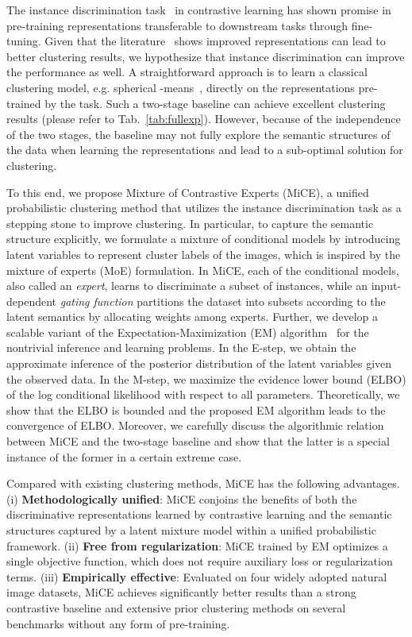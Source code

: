\documentclass{article} \usepackage{iclr2021_conference,times}
\begin{document}
The instance discrimination task~\citep{wu2018unsupervised,he2019momentum} in contrastive learning has shown promise in pre-training representations transferable to downstream tasks through fine-tuning. Given that the literature~\citep{shiran2019multi,niu2020gatcluster} shows improved representations can lead to better clustering results, we hypothesize that instance discrimination can improve the performance as well. A straightforward approach is to learn a classical clustering model, e.g. spherical -means~\citep{dhillon2001concept}, directly on the representations pre-trained by the task. Such a two-stage baseline can achieve excellent clustering results (please refer to Tab.~\ref{tab:fullexp}). 
However, because of the independence of the two stages, the baseline may not fully explore the semantic structures of the data when learning the representations and lead to a sub-optimal solution for clustering.


To this end, we propose  Mixture of Contrastive Experts (MiCE), a unified probabilistic clustering method that utilizes the instance discrimination task as a stepping stone to improve clustering. In particular,  to capture the semantic structure explicitly, we formulate a mixture of conditional models by introducing latent variables to represent cluster labels of the images, which is inspired by the mixture of experts (MoE) formulation.
In MiCE, each of the conditional models, also called an {\it expert}, learns to discriminate a subset of instances, 
while an input-dependent {\it gating function} partitions the dataset into subsets according to the latent semantics by allocating weights among experts. 
Further, we develop a scalable variant of the  Expectation-Maximization (EM) algorithm~\citep{dempster1977maximum} for the nontrivial inference and learning problems. In the E-step, we obtain the approximate inference of the posterior distribution of the latent variables given the observed data. In the M-step, we maximize the evidence lower bound (ELBO) of the log conditional likelihood with respect to all parameters. Theoretically, we show that the ELBO is bounded and the  proposed EM algorithm leads to the convergence of ELBO. Moreover, we carefully discuss the algorithmic relation between MiCE and the two-stage baseline and show that the latter is a special instance of the former in a certain extreme case.





Compared with existing clustering methods, MiCE has the following advantages. (i) \textbf{Methodologically unified}: MiCE conjoins the benefits of both the discriminative representations learned by contrastive learning and the semantic structures captured by a latent mixture model within a unified probabilistic framework. (ii) \textbf{Free from regularization}: MiCE trained by EM optimizes a single objective function, which does not require auxiliary loss or regularization terms. (iii) \textbf{Empirically effective}: Evaluated on four widely adopted  natural image datasets, MiCE achieves significantly better results than a strong contrastive baseline and extensive prior clustering methods on several benchmarks without any form of pre-training.
\end{document}
